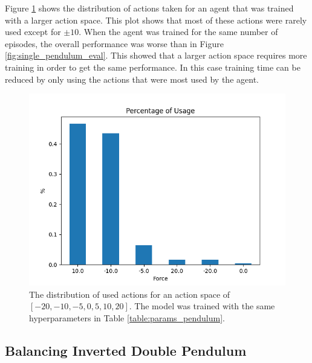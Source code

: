 \documentclass[final]{LTHtwocol} %
\begin{document}
Figure \ref{fig:pendulum_force} shows the distribution of actions taken for an agent that was trained with a larger action space. This plot shows that most of these actions were rarely used except for $\pm 10$. When the agent was trained for the same number of episodes, the overall performance was worse than in Figure \ref{fig:single_pendulum_eval}. This showed that a larger action space requires more training in order to get the same performance. In this case training time can be reduced by only using the actions that were most used by the agent.
\begin{figure}[htp]
	\centering
	\includegraphics[width=0.9\columnwidth]{figures/Pendulum_force.png}
	\caption{The distribution of used actions for an action space of $[-20,-10,-5,0,5,10,20]$. The model was trained with the same hyperparameters in Table \ref{table:params_pendulum}.}
	\label{fig:pendulum_force}
\end{figure}



\subsection{Balancing Inverted Double Pendulum}
\end{document}

